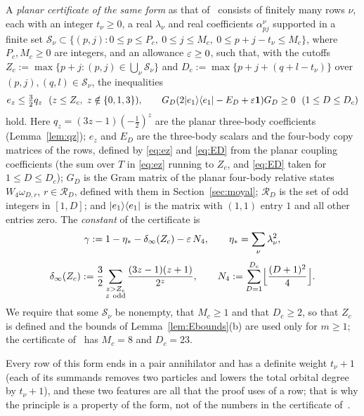 \begin{definition*}
A \emph{planar certificate of the same form} as that
of~\cite{OAI:A-Fock-space-inequality-and-the-Laughlin-spectral-gap-September-24-2026} consists of finitely many rows $\nu$, each with an
integer $t_\nu\ge0$, a real $\lambda_\nu$ and real coefficients $\alpha^\nu_{pj}$ supported in a finite set
$\mathcal S_\nu\subset\{(p,j):0\le p\le P_c,\ 0\le j\le M_c,\ 0\le p+j-t_\nu\le M_c\}$, where $P_c,M_c\ge0$ are integers, and an
allowance $\varepsilon\ge0$, such that, with the cutoffs $Z_c:=\max\{p+j:(p,j)\in\bigcup_\nu\mathcal S_\nu\}$ and
$D_c:=\max\{p+j+(q+l-t_\nu)\}$ over $(p,j),(q,l)\in\mathcal S_\nu$, the inequalities
\begin{equation}\label{eq:certgeneral}
e_z\le\tfrac32q_z\ \ (z\le Z_c,\ z\notin\{0,1,3\}),\qquad G_D(2\lvert e_1\rangle\langle e_1\rvert-E_D+\varepsilon\mathbf{1})G_D\ge0\ \ (1\le D\le D_c)
\end{equation}
hold. Here $q_z=(3z-1)(-\frac12)^z$ are the planar three-body coefficients (Lemma~\ref{lem:qz}); $e_z$ and $E_D$ are the three-body
scalars and the four-body copy matrices of the rows, defined by \eqref{eq:ez} and \eqref{eq:ED} from the planar coupling
coefficients (the sum over $T$ in \eqref{eq:ez} running to $Z_c$, and \eqref{eq:ED} taken for $1\le D\le D_c$); $G_D$ is the Gram
matrix of the planar four-body relative states $W_4\omega_{D,r}$, $r\in\mathcal R_D$, defined with them in Section~\ref{sec:moyal}; $\mathcal R_D$
is the set of odd integers in $[1,D]$; and $\lvert e_1\rangle\langle e_1\rvert$ is the matrix with $(1,1)$ entry $1$ and all other entries zero. The
\emph{constant} of the certificate is
\[
\gamma:=1-\eta_{*}-\delta_\infty(Z_c)-\varepsilon\,N_4,\qquad \eta_{*}=\sum_\nu\lambda_\nu^2,
\]
\[
\delta_\infty(Z_c):=\frac32\sum_{\substack{z>Z_c\\ z\ \mathrm{odd}}}\frac{(3z-1)(z+1)}{2^z},\qquad N_4:=\sum_{D=1}^{D_c}\Bigl\lfloor\frac{(D+1)^2}4\Bigr\rfloor .
\]
We require that some $\mathcal S_\nu$ be nonempty, that $M_c\ge1$ and that $D_c\ge2$, so that $Z_c$ is defined and the bounds of
Lemma~\ref{lem:Ebounds}(b) are used only for $m\ge1$; the certificate of~\cite{OAI:A-Fock-space-inequality-and-the-Laughlin-spectral-gap-September-24-2026}
has $M_c=8$ and $D_c=23$.
\end{definition*}

Every row of this form ends in a pair annihilator and has a definite weight $t_\nu+1$ (each of its summands removes two particles
and lowers the total orbital degree by $t_\nu+1$), and these two features are all that the proof uses of a row; that is why the
principle is a property of the form, not of the numbers in the certificate
of~\cite{OAI:A-Fock-space-inequality-and-the-Laughlin-spectral-gap-September-24-2026}.

